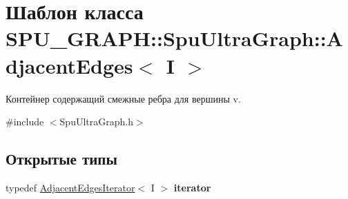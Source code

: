 \hypertarget{class_s_p_u___g_r_a_p_h_1_1_spu_ultra_graph_1_1_adjacent_edges}{}\section{Шаблон класса S\+P\+U\+\_\+\+G\+R\+A\+PH\+:\+:Spu\+Ultra\+Graph\+:\+:Adjacent\+Edges$<$ I $>$}
\label{class_s_p_u___g_r_a_p_h_1_1_spu_ultra_graph_1_1_adjacent_edges}


Контейнер содержащий смежные ребра для вершины v.  




{\ttfamily \#include $<$Spu\+Ultra\+Graph.\+h$>$}

\subsection*{Открытые типы}
\begin{DoxyCompactItemize}
\item 
\mbox{\label{class_s_p_u___g_r_a_p_h_1_1_spu_ultra_graph_1_1_adjacent_edges_a07295019466b1a51334abb9cfcfbef0c}} 
typedef \hyperlink{class_s_p_u___g_r_a_p_h_1_1_spu_ultra_graph_1_1_adjacent_edges_iterator}{Adjacent\+Edges\+Iterator}$<$ I $>$ {\bfseries iterator}
\end{DoxyCompactItemize}
